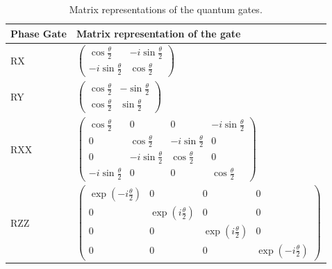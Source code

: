 \begin{table}[]
    \label{tab:qgates}
    \caption{Matrix representations of the quantum gates.}
        \begin{tabular}{l|l}
        \hline
        \multicolumn{1}{|l|}{Phase Gate}  & \multicolumn{1}{l|}{Matrix representation of the gate}                                                                                                                                                                                                                         \\ \hline
        RX                                & $\begin{pmatrix} \cos\frac{\theta}{2}&-i\sin\frac{\theta}{2}              \\ -i\sin\frac{\theta}{2}&\cos\frac{\theta}{2}                                                                                                                                        \end{pmatrix}$ \\
        RY                                & $\begin{pmatrix} \cos\frac{\theta}{2}&-\sin\frac{\theta}{2}               \\ \cos\frac{\theta}{2}&\sin\frac{\theta}{2}                                                                                                                                          \end{pmatrix}$ \\
        RXX                               & $\begin{pmatrix} \cos\frac{\theta}{2}&0&0&-i\sin\frac{\theta}{2}          \\ 0&\cos\frac{\theta}{2}&-i\sin\frac{\theta}{2}&0                           \\ 0&-i\sin\frac{\theta}{2}&\cos\frac{\theta}{2}&0 \\ -i\sin\frac{\theta}{2}&0&0&\cos\frac{\theta}{2}    \end{pmatrix}$ \\                               
        RZZ                               & $\begin{pmatrix} \exp(-i\frac{\theta}{2})&0&0&0                           \\ 0&\exp(i\frac{\theta}{2})&0&0                                             \\ 0&0&\exp(i\frac{\theta}{2})&0 \\ 0&0&0&\exp(-i\frac{\theta}{2})                                       \end{pmatrix}$ \\         

\end{tabular}
\end{table}
